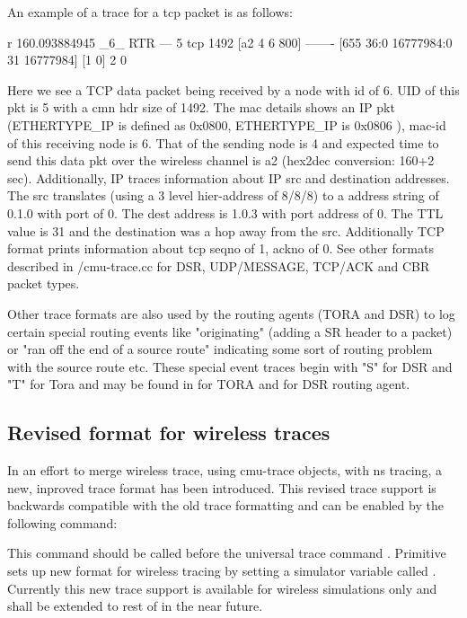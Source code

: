 An example of a trace for a tcp packet is as follows:
\begin{program}
r 160.093884945 _6_ RTR  --- 5 tcp 1492 [a2 4 6 800] ------- [655
36:0 16777984:0 31 16777984] [1 0] 2 0
\end{program}
Here we see a TCP data packet being received by a node with id of 6. UID
of this pkt is 5 with a cmn hdr size of 1492. The mac details shows an IP
pkt (ETHERTYPE\_IP is defined as 0x0800, ETHERTYPE\_IP is 0x0806 ), mac-id
of this receiving node is 6. That of the sending node is 4 and expected
time to send this data pkt over the wireless channel is a2 (hex2dec
conversion: 160+2 sec). Additionally, IP traces information about IP src
and destination addresses. The src translates (using a 3 level
hier-address of 8/8/8) to a address string of 0.1.0 with port of 0. The
dest address is 1.0.3 with port address of 0. The TTL value is 31 and the
destination was a hop away from the src. Additionally TCP format prints
information about tcp seqno of 1, ackno of 0. See other formats described
in \nsf/cmu-trace.cc for DSR, UDP/MESSAGE, TCP/ACK and CBR packet types.

Other trace formats are also used by the routing agents (TORA and DSR) to
log certain special routing events like "originating" (adding a SR header
to a packet) or  "ran off the end of a source route" indicating some sort
of routing problem with the source route etc. These special event traces
begin with "S" for DSR and "T" for Tora and may
be found in  for TORA and  for DSR
routing agent.


\subsection{Revised format for wireless traces}
\label{sec:revtraceformat}

In an effort to merge wireless trace, using cmu-trace objects, with
ns tracing, a new, inproved trace format has been introduced. This revised
trace support is backwards compatible with the old trace formatting and
can be enabled by the following command:
This command should be called before the universal trace command
. Primitive  sets up new
format for wireless tracing by setting a simulator variable called
. Currently this new trace support is available for
wireless simulations only and shall be extended to rest of \ns in the near
future.

